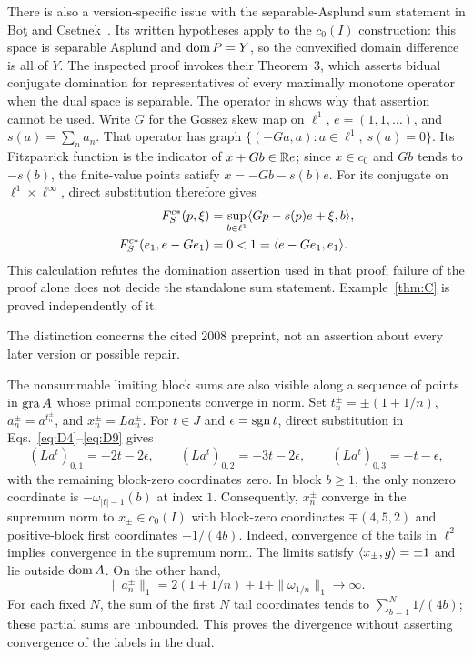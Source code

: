 \begin{remark}
There is also a version-specific issue with the separable-Asplund sum
statement in Bo\c{t} and Csetnek~\cite[Corollary~11]{botcsetnek2008}.
Its written hypotheses apply to the $c_0(I)$ construction: this space
is separable Asplund and $\operatorname{dom} P=Y$, so the convexified domain difference
is all of $Y$. The inspected proof invokes their Theorem~3, which asserts
bidual conjugate domination for representatives of every maximally
monotone operator when the dual space is separable. The operator in
\cite[author version, Lemma~2.1]{buenosvaiter2011} shows why that assertion cannot be used.
Write $G$ for the Gossez skew map on $\ell^1$, $e=(1,1,\ldots)$, and
$s(a)=\sum_n a_n$. That operator has graph
$\{(-Ga,a):a\in\ell^1,\ s(a)=0\}$. Its Fitzpatrick function is the
indicator of $x+Gb\in\mathbb R e$; since $x\in c_0$ and $Gb$ tends to $-s(b)$,
the finite-value points satisfy $x=-Gb-s(b)e$. For its conjugate on
$\ell^1\times\ell^\infty$, direct substitution therefore gives
\begin{equation}
\begin{aligned}
F_S^{c*}(p,\xi)
 &=\sup_{b\in\ell^1}\langle Gp-s(p)e+\xi,b\rangle,\\
F_S^{c*}(e_1,e-Ge_1)&=0<1=\langle e-Ge_1,e_1\rangle.
\end{aligned}
\label{eq:bidual-interface}
\end{equation}
This calculation refutes the domination assertion used in that proof;
failure of the proof alone does not decide the standalone sum statement.
Example~\ref{thm:C} is proved independently of it.

The distinction concerns the cited 2008 preprint, not an assertion about
every later version or possible repair.
\end{remark}

\begin{remark}
\label{sec:structure}
The nonsummable limiting block sums are also visible along a sequence
of points in $\operatorname{gra} A$ whose primal components converge in norm.
Set $t_n^\pm=\pm(1+1/n)$, $a_n^\pm=a^{t_n^\pm}$, and
$x_n^\pm=La_n^\pm$. For $t\in J$ and $\epsilon=\operatorname{sgn} t$,
direct substitution in Eqs.~\eqref{eq:D4}--\eqref{eq:D9} gives
\[
(La^t)_{0,1}=-2t-2\epsilon,\qquad
(La^t)_{0,2}=-3t-2\epsilon,\qquad
(La^t)_{0,3}=-t-\epsilon,
\]
with the remaining block-zero coordinates zero. In block $b\ge1$,
the only nonzero coordinate is $-\omega_{|t|-1}(b)$ at index $1$.
Consequently, $x_n^\pm$ converge in the supremum norm to
$x_\pm\in c_0(I)$ with block-zero coordinates $\mp(4,5,2)$ and
positive-block first coordinates $-1/(4b)$. Indeed, convergence of
the tails in $\ell^2$ implies convergence in the supremum norm.
The limits satisfy $\langle x_\pm,g\rangle=\pm1$ and lie outside $\operatorname{dom} A$.
On the other hand,
\[
\|a_n^\pm\|_1=2(1+1/n)+1+\|\omega_{1/n}\|_1\longrightarrow\infty.
\]
For each fixed $N$, the sum of the first $N$ tail coordinates tends to
$\sum_{b=1}^N1/(4b)$; these partial sums are unbounded. This proves
the divergence without asserting convergence of the labels in the dual.

\end{remark}

